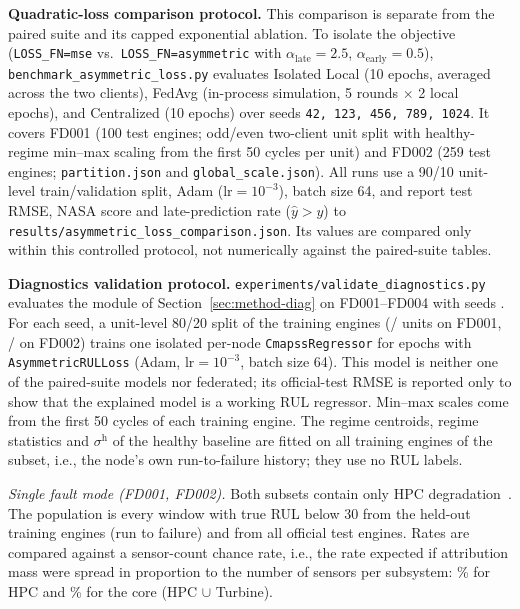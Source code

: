 \textbf{Quadratic-loss comparison protocol.} This comparison is separate from the paired suite and its capped exponential ablation. To isolate the objective (\texttt{LOSS\_FN=mse} vs.\ \texttt{LOSS\_FN=asymmetric} with $\alpha_{\text{late}}{=}2.5$, $\alpha_{\text{early}}{=}0.5$), \texttt{benchmark\_asymmetric\_loss.py} evaluates Isolated Local (10 epochs, averaged across the two clients), FedAvg (in-process simulation, 5 rounds $\times$ 2 local epochs), and Centralized (10 epochs) over seeds \texttt{42, 123, 456, 789, 1024}. It covers FD001 (100 test engines; odd/even two-client unit split with healthy-regime min--max scaling from the first 50 cycles per unit) and FD002 (259 test engines; \texttt{partition.json} and \texttt{global\_scale.json}). All runs use a 90/10 unit-level train/validation split, Adam ($\text{lr}{=}10^{-3}$), batch size 64, and report test RMSE, NASA score and late-prediction rate ($\hat{y} > y$) to \texttt{results/asymmetric\_loss\_comparison.json}. Its values are compared only within this controlled protocol, not numerically against the paired-suite tables.

\textbf{Diagnostics validation protocol.} \texttt{experiments/validate\_diagnostics.py} evaluates the module of Section~\ref{sec:method-diag} on FD001--FD004 with seeds \DiagSeeds{}. For each seed, a unit-level 80/20 split of the training engines (\DiagFdOneTrainUnits{}/\DiagFdOneHeldoutUnits{} units on FD001, \DiagFdTwoTrainUnits{}/\DiagFdTwoHeldoutUnits{} on FD002) trains one isolated per-node \texttt{CmapssRegressor} for \DiagEpochs{} epochs with \texttt{AsymmetricRULLoss} (Adam, $\text{lr}{=}10^{-3}$, batch size 64). This model is neither one of the paired-suite models nor federated; its official-test RMSE is reported only to show that the explained model is a working RUL regressor. Min--max scales come from the first 50 cycles of each training engine. The regime centroids, regime statistics and $\sigma^{\text{h}}$ of the healthy baseline are fitted on all training engines of the subset, i.e., the node's own run-to-failure history; they use no RUL labels.

\emph{Single fault mode (FD001, FD002).} Both subsets contain only HPC degradation~\cite{saxena2008damage}. The population is every window with true RUL below 30 from the held-out training engines (run to failure) and from all official test engines. Rates are compared against a sensor-count chance rate, i.e., the rate expected if attribution mass were spread in proportion to the number of sensors per subsystem: \DiagChanceHpc{}\% for HPC and \DiagChanceCore{}\% for the core (HPC $\cup$ Turbine).

